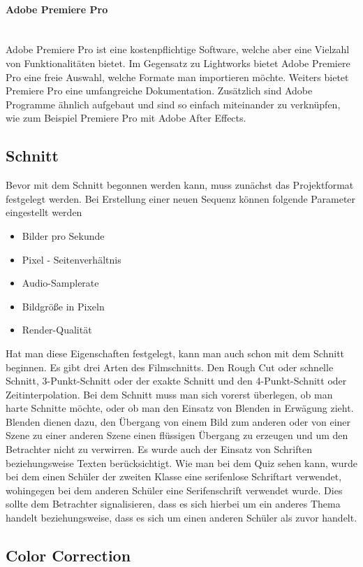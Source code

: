 \paragraph{Adobe Premiere Pro}
\leavevmode \\
Adobe Premiere Pro ist eine kostenpflichtige Software, welche aber eine Vielzahl von Funktionalitäten bietet. Im Gegensatz zu Lightworks bietet Adobe Premiere Pro eine freie Auswahl, welche Formate man importieren möchte. Weiters bietet Premiere Pro eine umfangreiche Dokumentation. Zusätzlich sind Adobe Programme ähnlich aufgebaut und sind so einfach miteinander zu verknüpfen, wie zum Beispiel Premiere Pro mit Adobe After Effects. 
\subsection{Schnitt}
Bevor mit dem Schnitt begonnen werden kann, muss zunächst das Projektformat festgelegt werden. Bei Erstellung einer neuen Sequenz können folgende Parameter eingestellt werden
\begin{itemize}
	\item Bilder pro Sekunde
	\item Pixel - Seitenverhältnis
	\item Audio-Samplerate
	\item Bildgröße in Pixeln
	\item Render-Qualität
\end{itemize}
Hat man diese Eigenschaften festgelegt, kann man auch schon mit dem Schnitt beginnen. Es gibt drei Arten des Filmschnitts. Den Rough Cut oder schnelle Schnitt, 3-Punkt-Schnitt oder der exakte Schnitt und den 4-Punkt-Schnitt oder Zeitinterpolation. Bei dem Schnitt muss man sich vorerst überlegen, ob man harte Schnitte möchte, oder ob man den Einsatz von Blenden in Erwägung zieht. Blenden dienen dazu, den Übergang von einem Bild zum anderen oder von einer Szene zu einer anderen Szene einen flüssigen Übergang zu erzeugen und um den Betrachter nicht zu verwirren.
Es wurde auch der Einsatz von Schriften beziehungsweise Texten berücksichtigt. Wie man bei dem Quiz sehen kann, wurde bei dem einen Schüler der zweiten Klasse eine serifenlose Schriftart verwendet, wohingegen bei dem anderen Schüler eine Serifenschrift verwendet wurde. Dies sollte dem Betrachter signalisieren, dass es sich hierbei um ein anderes Thema handelt beziehungsweise, dass es sich um einen anderen Schüler als zuvor handelt.
\subsection{Color Correction}
